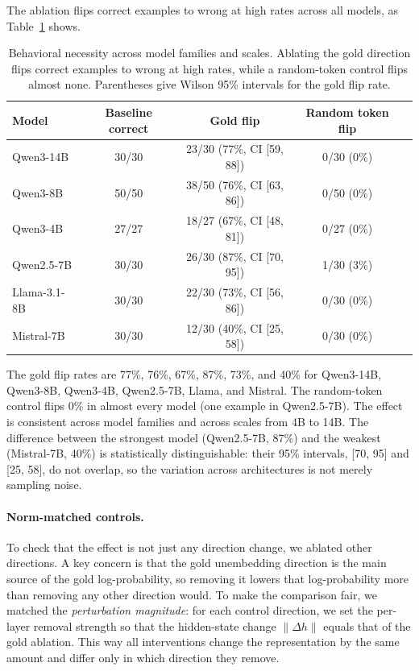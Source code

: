 \documentclass{article} %
\begin{document}
The ablation flips correct examples to wrong at high rates across all models, as Table~\ref{tab:ablation} shows.

\begin{table}[h]
\centering
\caption{Behavioral necessity across model families and scales. Ablating the gold direction flips correct examples to wrong at high rates, while a random-token control flips almost none. Parentheses give Wilson 95\% intervals for the gold flip rate.}
\label{tab:ablation}
\begin{tabular}{lcccc}
\toprule
\textbf{Model} & \textbf{Baseline correct} & \textbf{Gold flip} & \textbf{Random token flip} \\
\midrule
Qwen3-14B & 30/30 & 23/30 (77\%, CI [59, 88]) & 0/30 (0\%) \\
Qwen3-8B & 50/50 & 38/50 (76\%, CI [63, 86]) & 0/50 (0\%) \\
Qwen3-4B & 27/27 & 18/27 (67\%, CI [48, 81]) & 0/27 (0\%) \\
Qwen2.5-7B & 30/30 & 26/30 (87\%, CI [70, 95]) & 1/30 (3\%) \\
Llama-3.1-8B & 30/30 & 22/30 (73\%, CI [56, 86]) & 0/30 (0\%) \\
Mistral-7B & 30/30 & 12/30 (40\%, CI [25, 58]) & 0/30 (0\%) \\
\bottomrule
\end{tabular}
\end{table}

The gold flip rates are 77\%, 76\%, 67\%, 87\%, 73\%, and 40\% for Qwen3-14B, Qwen3-8B, Qwen3-4B, Qwen2.5-7B, Llama, and Mistral. The random-token control flips 0\% in almost every model (one example in Qwen2.5-7B). The effect is consistent across model families and across scales from 4B to 14B. The difference between the strongest model (Qwen2.5-7B, 87\%) and the weakest (Mistral-7B, 40\%) is statistically distinguishable: their 95\% intervals, [70, 95] and [25, 58], do not overlap, so the variation across architectures is not merely sampling noise.

\paragraph{Norm-matched controls.}
To check that the effect is not just any direction change, we ablated other directions. A key concern is that the gold unembedding direction is the main source of the gold log-probability, so removing it lowers that log-probability more than removing any other direction would. To make the comparison fair, we matched the \emph{perturbation magnitude}: for each control direction, we set the per-layer removal strength so that the hidden-state change $\lVert \Delta h \rVert$ equals that of the gold ablation. This way all interventions change the representation by the same amount and differ only in which direction they remove.
\end{document}
